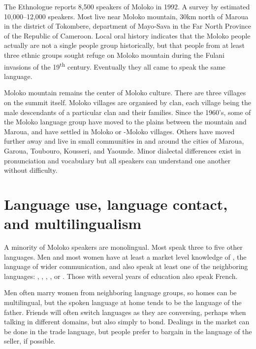 The Ethnologue \citep{LewisSimonsFennig2009} reports 8,500 speakers of Moloko in 1992. A survey by \citet{Starr1997} estimated 10,000--12,000 speakers. Most live near Moloko mountain, 30km north of Maroua in the district of Tokombere, department of Mayo-Sava in the Far North Province of the Republic of Cameroon. Local oral history indicates that the Moloko people actually are not a single people group historically, but that people from at least three ethnic groups sought refuge on Moloko mountain during the Fulani invasions of the 19\textsuperscript{th} century. Eventually they all came to speak the same language. 

Moloko mountain remains the center of Moloko culture. There are three villages on the summit itself. Moloko villages are organised by clan, each village being the male descendants of a particular clan and their families. Since the 1960’s, some of the Moloko language group have moved to the plains between the mountain and Maroua, and have settled in Moloko or -Moloko villages. Others have moved further away and live in small communities in and around the cities of Maroua, Garoua, Toubouro, Kousseri, and Yaounde. Minor dialectal differences exist in pronunciation and vocabulary but all speakers can understand one another without difficulty.   

\section{Language use, language contact, and multilingualism}\label{sec:1.2}
\hypertarget{RefHeading1210281525720847}{}
A minority of Moloko speakers are monolingual.  Most  speak three to five other languages.  Men and most women have at least a market level knowledge of , the language of wider communication, and also speak at least one of the neighboring languages: , , , , or .  Those with several years of education also speak French.  

Men often marry women from neighboring language groups, so homes can be multilingual, but the spoken language at home tends to be the language of the father.  Friends will often switch languages as they are conversing, perhaps when talking in different domains, but also simply to bond.  Dealings in the market can be done in the trade language, but people prefer to bargain in the language of the seller, if possible.  

